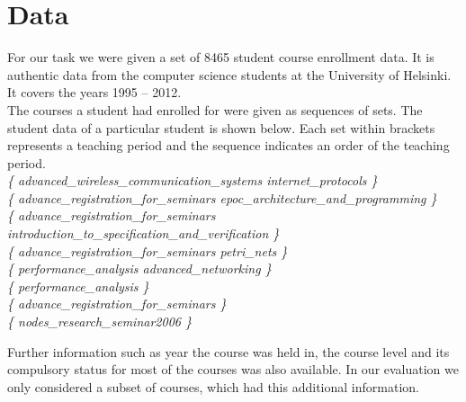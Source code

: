 \section{Data}
For our task we were given a set of 8465 student course enrollment data. It is authentic data from the computer science students at the University of Helsinki. It covers the years 1995 – 2012.\\

The courses a student had enrolled for were given as sequences of sets. The student data of a particular student is shown below. Each set within { } brackets represents a teaching period and the sequence indicates an order of the teaching period.\\

\textit{
\{ advanced\_wireless\_communication\_systems internet\_protocols \}\\
\{ advance\_registration\_for\_seminars epoc\_architecture\_and\_programming \}\\
\{ advance\_registration\_for\_seminars introduction\_to\_specification\_and\_verification \}\\
\{ advance\_registration\_for\_seminars petri\_nets \}\\
\{ performance\_analysis advanced\_networking \}\\
\{ performance\_analysis \}\\
\{ advance\_registration\_for\_seminars \}\\
\{ nodes\_research\_seminar2006 \}\\
}

Further information such as year the course was held in, the course level and its compulsory status for most of the courses was also available. In our evaluation we only considered a subset of courses, which had this additional information.
